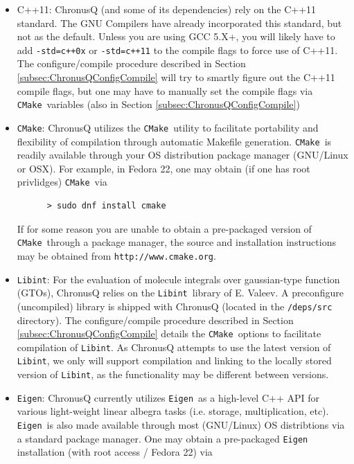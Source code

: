 \documentclass[12pt]{article}
\newcommand{\CMake}{\texttt{CMake}}
\newcommand{\Libint}{\texttt{Libint}}
\newcommand{\Eigen}{\texttt{Eigen}}
\begin{document}
    \begin{itemize}
      \item C++11: ChronusQ (and some of its dependencies) rely on the C++11 
        standard. The GNU Compilers have already incorporated this standard, but
	not as the default. Unless you are using GCC 5.X+, you will likely have
	to add \texttt{-std=c++0x} or \texttt{-std=c++11} to the compile flags
	to force use of C++11. The configure/compile procedure described in
	Section \ref{subsec:ChronusQConfigCompile} will try to smartly figure out
	the C++11 compile flags, but one may have to manually set the compile flags
	via \CMake~variables (also in Section \ref{subsec:ChronusQConfigCompile})

      \item \CMake: ChronusQ utilizes the \CMake~utility to facilitate
        portability and flexibility of compilation through automatic Makefile 
	generation. \CMake~is readily available through your OS distribution
	package manager (GNU/Linux or OSX). For example, in Fedora 22, one may 
	obtain (if one has root privlidges) \CMake~via

	\begin{lstlisting}
	  > sudo dnf install cmake
	\end{lstlisting}
	If for some reason you are unable to obtain a pre-packaged version of 
	\CMake~through a package manager, the source and installation
	instructions may be obtained from \texttt{http://www.cmake.org}.

      \item \Libint: For the evaluation of molecule integrals over gaussian-type
        function (GTOs), ChronusQ relies on the \Libint~library of E. Valeev. A
	preconfigure (uncompiled) library is shipped with ChronusQ (located in
	the \texttt{/deps/src} directory). The configure/compile procedure
	described in Section \ref{subsec:ChronusQConfigCompile} details the
	\CMake~options to facilitate compilation of \Libint. As ChronusQ attempts
	to use the latest version of \Libint, we only will support compilation
	and linking to the locally stored version of \Libint, as the functionality
	may be different between versions.

      \item \Eigen: ChronusQ currently utilizes \Eigen~as a high-level C++ API for
        various light-weight linear albegra tasks (i.e. storage, multiplication,
	etc). \Eigen~is also made available through most (GNU/Linux) OS distribtions
	via a standard package manager. One may obtain a pre-packaged \Eigen~
	installation (with root access / Fedora 22) via


\end{itemize}
\end{document}
